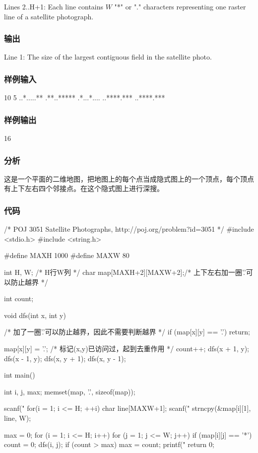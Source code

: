 Lines 2..H+1: Each line contains $W$ "*" or "." characters representing one raster line of a satellite photograph.


\subsubsection{输出}
Line 1: The size of the largest contiguous field in the satellite photo.


\subsubsection{样例输入}
\begin{Code}
10 5
..*.....**
.**..*****
.*...*....
..****.***
..****.***
\end{Code}


\subsubsection{样例输出}
\begin{Code}
16
\end{Code}


\subsubsection{分析}
这是一个平面的二维地图，把地图上的每个点当成隐式图上的一个顶点，每个顶点有上下左右四个邻接点。在这个隐式图上进行深搜。


\subsubsection{代码}
\begin{Codex}[label=satellite_photographs.c]
/* POJ 3051 Satellite Photographs, http://poj.org/problem?id=3051 */
#include <stdio.h>
#include <string.h>

#define MAXH 1000
#define MAXW 80

int H, W; /* H行W列 */
char map[MAXH+2][MAXW+2];/* 上下左右加一圈'.'可以防止越界 */

int count;

void dfs(int x, int y) {
    /* 加了一圈'.'可以防止越界，因此不需要判断越界 */
    if (map[x][y] == '.') return;

    map[x][y] = '.';  /* 标记(x,y)已访问过，起到去重作用 */
    count++;
    dfs(x + 1, y);
    dfs(x - 1, y);
    dfs(x, y + 1);
    dfs(x, y - 1);
}

int main() {
    int i, j, max;
    memset(map, '.', sizeof(map));

    scanf("%
    for(i = 1; i <= H; ++i) {
        char line[MAXW+1];
        scanf("%
        strncpy(&map[i][1], line, W);
    }

    max = 0;
    for (i = 1; i <= H; i++) {
        for (j = 1; j <= W; j++) {
            if (map[i][j] == '*') {
                count = 0;
                dfs(i, j);
            }
            if (count > max) max = count;
        }
    }
    printf("%
    return 0;
}
\end{Codex}


